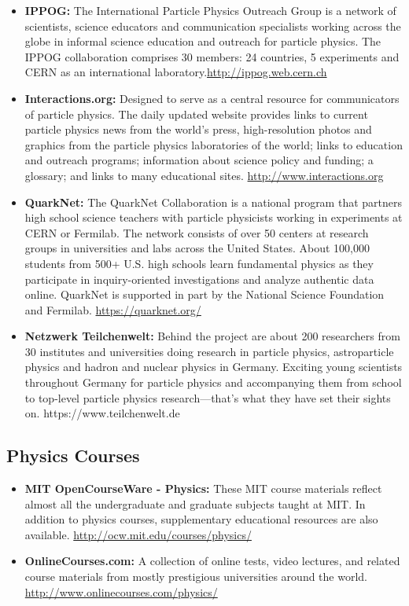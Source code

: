 \begin{itemize}
\item
  \textbf{IPPOG:} The International Particle Physics Outreach Group is a
  network of scientists, science educators and communication specialists
  working across the globe in informal science education and outreach
  for particle physics. The IPPOG collaboration comprises 30 members: 24
  countries, 5 experiments and CERN as an international
  laboratory.\url{http://ippog.web.cern.ch}
\item
  \textbf{Interactions.org:} Designed to serve as a central resource for
  communicators of particle physics. The daily updated website provides
  links to current particle physics news from the world's press,
  high-resolution photos and graphics from the particle physics
  laboratories of the world; links to education and outreach programs;
  information about science policy and funding; a glossary; and links to
  many educational sites. \url{http://www.interactions.org}
\item
  \textbf{QuarkNet:} The QuarkNet Collaboration is a national program
  that partners high school science teachers with particle physicists
  working in experiments at CERN or Fermilab. The network consists of
  over 50 centers at research groups in universities and labs across the
  United States. About 100,000 students from 500+ U.S. high schools
  learn fundamental physics as they participate in inquiry-oriented
  investigations and analyze authentic data online. QuarkNet is
  supported in part by the National Science Foundation and Fermilab.
  \url{https://quarknet.org/}
\item
  \textbf{Netzwerk Teilchenwelt:} Behind the project are about 200
  researchers from 30 institutes and universities doing research in
  particle physics, astroparticle physics and hadron and nuclear physics
  in Germany. Exciting young scientists throughout Germany for particle
  physics and accompanying them from school to top-level particle
  physics research---that's what they have set their sights on.
  https://www.teilchenwelt.de
\end{itemize}

\subsection{Physics Courses}\label{databases:subsec:edusitescourses}

\begin{itemize}
\item
  \textbf{MIT OpenCourseWare - Physics:} These MIT course materials
  reflect almost all the undergraduate and graduate subjects taught at
  MIT. In addition to physics courses, supplementary educational
  resources are also available.
  \url{http://ocw.mit.edu/courses/physics/}
\item
  \textbf{OnlineCourses.com:} A collection of online tests, video
  lectures, and related course materials from mostly prestigious
  universities around the world.
  \url{http://www.onlinecourses.com/physics/}
\end{itemize}
